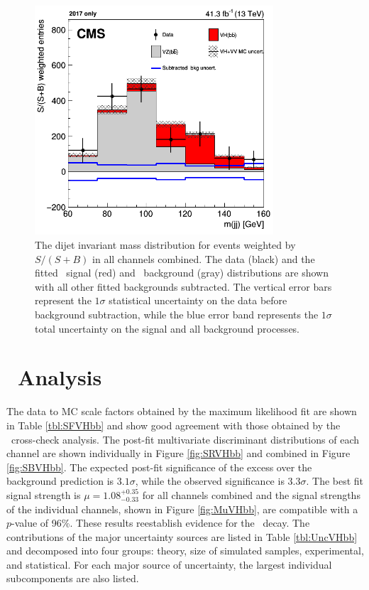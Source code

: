 \begin{figure}[htbp]
  \centering
    \includegraphics[width=3.5in]{images/only2017_shapesMjj1617_postfit}
    \caption[Combined Dijet Invariant Mass Distribution]{The dijet invariant mass distribution for events weighted by $S/(S+B)$ in all channels combined. The data (black) and the fitted \VHbb\ signal (red) and \VZbb\ background (gray) distributions are shown with all other fitted backgrounds subtracted. The vertical error bars represent the $1\sigma$ statistical uncertainty on the data before background subtraction, while the blue error band represents the $1\sigma$ total uncertainty on the signal and all background processes.}
    \label{fig:WeightedMjj}
\end{figure}

\section{\VHbb\ Analysis}

The data to MC scale factors obtained by the maximum likelihood fit are shown in Table \ref{tbl:SFVHbb} and show good agreement with those obtained by the \VZbb\ cross-check analysis. The post-fit multivariate discriminant distributions of each channel are shown individually in Figure \ref{fig:SRVHbb} and combined in Figure \ref{fig:SBVHbb}. The expected post-fit significance of the excess over the background prediction is $3.1\sigma$, while the observed significance is $3.3\sigma$. The best fit signal strength is $\mu = 1.08_{-0.33}^{+0.35}$ for all channels combined and the signal strengths of the individual channels, shown in Figure \ref{fig:MuVHbb}, are compatible with a $p$-value of 96\%. These results reestablish evidence for the \VHbb\ decay. The contributions of the major uncertainty sources are listed in Table \ref{tbl:UncVHbb} and decomposed into four groups: theory, size of simulated samples, experimental, and statistical. For each major source of uncertainty, the largest individual subcomponents are also listed.

